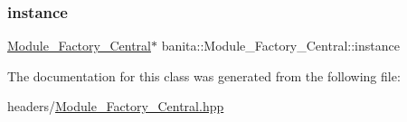 \subsubsection{\texorpdfstring{instance}{instance}}
{\footnotesize\ttfamily \mbox{\hyperlink{classbanita_1_1_module___factory___central}{Module\+\_\+\+Factory\+\_\+\+Central}}$\ast$ banita\+::\+Module\+\_\+\+Factory\+\_\+\+Central\+::instance\hspace{0.3cm}{\ttfamily [static]}}



The documentation for this class was generated from the following file\+:\begin{DoxyCompactItemize}
\item 
headers/\mbox{\hyperlink{_module___factory___central_8hpp}{Module\+\_\+\+Factory\+\_\+\+Central.\+hpp}}\end{DoxyCompactItemize}
